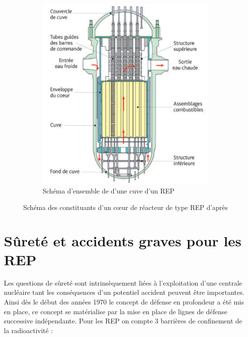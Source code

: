 \begin{figure}[H]
\begin{subfigure}[t]{0.45\textwidth}
     	\centering
     	\includegraphics[width=0.99\textwidth]{figure/coeur_complet.png}
     	\caption{Schéma d'ensemble de d'une cuve d'un REP}
     	\label{subfig:example-image-c}
    	 \end{subfigure}
	     \caption{Schéma des constituants d'un c\oe ur de réacteur de type REP d'après \cite{ clement_les_2020} }
	     \label{fig:test_subfigure}
	\end{figure}
\section{Sûreté et accidents graves pour les REP}
Les questions de sûreté sont intrinsèquement liées à l'exploitation d'une centrale nucléaire tant les conséquences d'un potentiel accident peuvent être importantes. Ainsi dès le début des années 1970 le concept de défense en profondeur a été mis en place, ce concept se matérialise par la mise en place de lignes de défense successive indépendante. Pour les REP on compte 3 barrières de confinement de la radioactivité :

